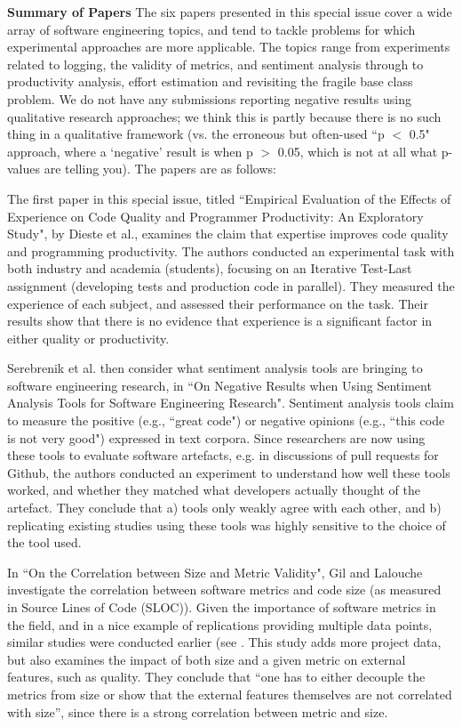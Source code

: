 \documentclass{svjour3}                     %
\begin{document}
\noindent\textbf{Summary of Papers} The six papers presented in this special issue cover a wide array of software engineering topics, and tend to tackle problems for which experimental approaches are more applicable. The topics range from experiments related to logging, the validity of metrics, and sentiment analysis through to productivity analysis, effort estimation and revisiting the fragile base class problem. We do not have any submissions reporting negative results using qualitative research approaches; we think this is partly because there is no such thing in a qualitative framework (vs. the erroneous but often-used ``p $<$ 0.5" approach, where a `negative' result is when p $>$ 0.05, which is not at all what p-values are telling you). The papers are as follows:

The first paper in this special issue, titled
``Empirical Evaluation of the Effects of Experience on Code Quality and Programmer Productivity: An Exploratory Study", by Dieste et al., examines the claim that expertise improves code quality and programming productivity. The authors conducted  an experimental task with both industry and academia (students), focusing on an Iterative Test-Last assignment (developing tests and production code in parallel). They measured the experience of each subject, and assessed their performance on the task. Their results show that there is no evidence that experience is a significant factor in either quality or productivity. 

Serebrenik et al. then consider what sentiment analysis tools are bringing to software engineering research, in ``On Negative Results when Using Sentiment Analysis Tools for Software Engineering Research". Sentiment analysis tools claim to measure the positive (e.g., ``great code") or negative opinions (e.g., ``this code is not very good") expressed in text corpora. Since researchers are now using these tools to evaluate software artefacts, e.g. in discussions of pull requests for Github, the authors conducted an experiment to understand how well these tools worked, and whether they matched what developers actually thought of the artefact. They conclude that a) tools only weakly agree with each other, and b) replicating existing studies using these tools was highly sensitive to the choice of the tool used.

In ``On the Correlation between Size and Metric Validity", Gil and Lalouche investigate the correlation between software metrics and code size (as measured in Source Lines of Code (SLOC)). Given the importance of software metrics in the field,  and in a nice example of replications providing multiple data points, similar studies were conducted earlier (see \cite{shepperd,herraiz}. This study adds more project data, but also examines the impact of both size and a given metric on external features, such as quality. They conclude that ``one has to either decouple the metrics from size or show that the external features themselves are not correlated with size'', since there is a strong correlation between metric and size.
\end{document}
